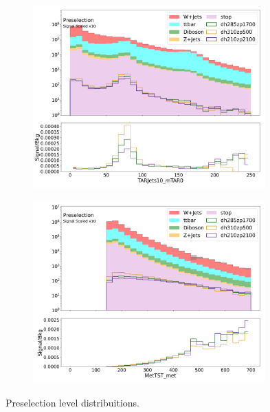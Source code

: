 \begin{figure}[htbp]
\begin{subfigure}{0.49\textwidth}
     \includegraphics[width = 0.98\textwidth]{Figures/appendix/Preselection/TARJets10_mTAR0.png}
     \caption{\mTAR}
     \end{subfigure}
     \begin{subfigure}{0.49\textwidth}
     \includegraphics[width = 0.98\textwidth]{Figures/appendix/Preselection/MetTST_met.png}
     \caption{\met}
     \end{subfigure}

     \caption{Preselection level distribuitions.}
     \label{fig:Presel1}
  \end{figure}

